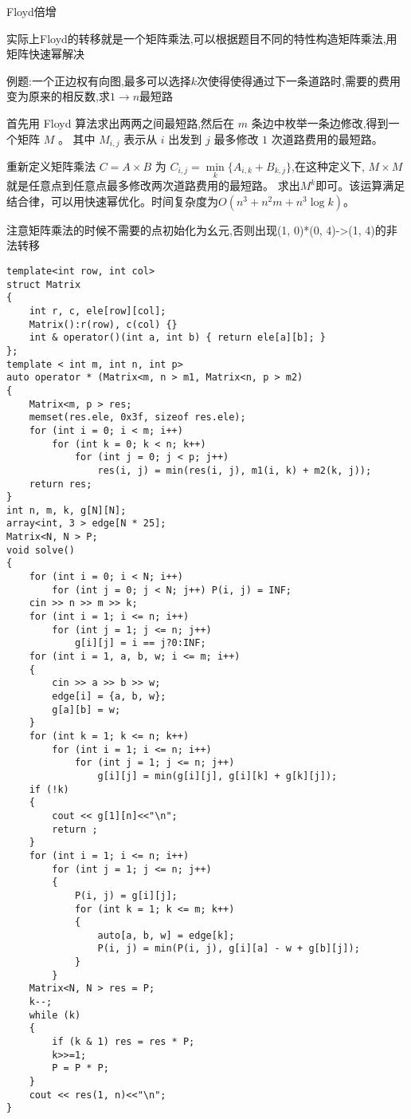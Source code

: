 \documentclass[a4paper, fontset=none]{ctexart}
\begin{document}
Floyd倍增

实际上Floyd的转移就是一个矩阵乘法,可以根据题目不同的特性构造矩阵乘法,用矩阵快速幂解决

例题:一个正边权有向图,最多可以选择$k$次使得使得通过下一条道路时,需要的费用变为原来的相反数,求$1\rightarrow n$最短路

首先用 Floyd 算法求出两两之间最短路,然后在 $m$ 条边中枚举一条边修改,得到一个矩阵 $M$ 。
其中 $M_{i, j}$ 表示从 $i$ 出发到 $j$ 最多修改 $1$ 次道路费用的最短路。

重新定义矩阵乘法 $C=A\times B$ 为 $C_{i, j}=\min\limits_k\{A_{i, k}+B_{k, j}\}$,在这种定义下,
$M\times M$ 就是任意点到任意点最多修改两次道路费用的最短路。
求出$M ^ k$即可。该运算满足结合律，可以用快速幂优化。时间复杂度为$O(n ^ 3+n ^ 2m+n ^ 3\log k)$。

注意矩阵乘法的时候不需要的点初始化为幺元,否则出现(1, 0)*(0, 4)->(1, 4)的非法转移

\begin{verbatim}
template<int row, int col>
struct Matrix
{
    int r, c, ele[row][col];
    Matrix():r(row), c(col) {}
    int & operator()(int a, int b) { return ele[a][b]; }
};
template < int m, int n, int p>
auto operator * (Matrix<m, n > m1, Matrix<n, p > m2)
{
    Matrix<m, p > res;
    memset(res.ele, 0x3f, sizeof res.ele);
    for (int i = 0; i < m; i++)
        for (int k = 0; k < n; k++)
            for (int j = 0; j < p; j++)
                res(i, j) = min(res(i, j), m1(i, k) + m2(k, j));
    return res;
}
int n, m, k, g[N][N];
array<int, 3 > edge[N * 25];
Matrix<N, N > P;
void solve()
{
    for (int i = 0; i < N; i++)
        for (int j = 0; j < N; j++) P(i, j) = INF;
    cin >> n >> m >> k;
    for (int i = 1; i <= n; i++)
        for (int j = 1; j <= n; j++)
            g[i][j] = i == j?0:INF;
    for (int i = 1, a, b, w; i <= m; i++)
    {
        cin >> a >> b >> w;
        edge[i] = {a, b, w};
        g[a][b] = w;
    }
    for (int k = 1; k <= n; k++)
        for (int i = 1; i <= n; i++)
            for (int j = 1; j <= n; j++)
                g[i][j] = min(g[i][j], g[i][k] + g[k][j]);
    if (!k)
    {
        cout << g[1][n]<<"\n";
        return ;
    }
    for (int i = 1; i <= n; i++)
        for (int j = 1; j <= n; j++)
        {
            P(i, j) = g[i][j];
            for (int k = 1; k <= m; k++)
            {
                auto[a, b, w] = edge[k];
                P(i, j) = min(P(i, j), g[i][a] - w + g[b][j]);
            }
        }
    Matrix<N, N > res = P;
    k--;
    while (k)
    {
        if (k & 1) res = res * P;
        k>>=1;
        P = P * P;
    }
    cout << res(1, n)<<"\n";
}
\end{verbatim}
\end{document}
